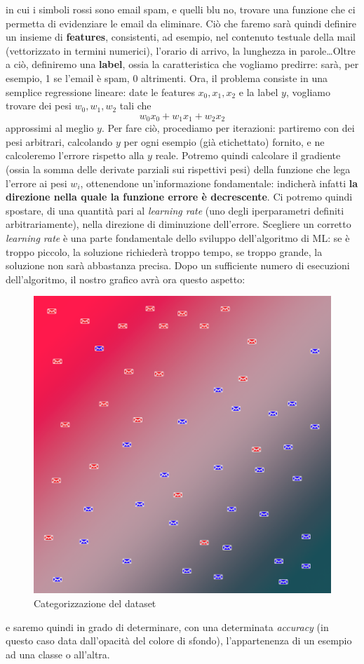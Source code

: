 in cui i simboli rossi sono email spam, e quelli blu no, trovare una funzione che ci permetta di evidenziare le email da eliminare. Ciò che faremo sarà quindi definire un insieme di \textbf{features}, consistenti, ad esempio, nel contenuto testuale della mail (vettorizzato in termini numerici), l'orario di arrivo, la lunghezza in parole\dots Oltre a ciò, definiremo una \textbf{label}, ossia la caratteristica che vogliamo predirre: sarà, per esempio, 1 se l'email è spam, 0 altrimenti. Ora, il problema consiste in una semplice regressione lineare: date le features $x_0, x_1, x_2$ e la label $y$, vogliamo trovare dei pesi $w_0, w_1, w_2$ tali che
\begin{displaymath}
    w_0x_0+w_1x_1+w_2x_2
\end{displaymath}
approssimi al meglio $y$. Per fare ciò, procediamo per iterazioni: partiremo con dei pesi arbitrari, calcolando $y$ per ogni esempio (già etichettato) fornito, e ne calcoleremo l'errore rispetto alla $y$ reale. Potremo quindi calcolare il gradiente (ossia la somma delle derivate parziali sui rispettivi pesi) della funzione che lega l'errore ai pesi $w_i$, ottenendone un'informazione fondamentale: indicherà infatti \textbf{la direzione nella quale la funzione errore è decrescente}. Ci potremo quindi spostare, di una quantità pari al \textit{learning rate} (uno degli iperparametri definiti arbitrariamente), nella direzione di diminuzione dell'errore. Scegliere un corretto \textit{learning rate} è una parte fondamentale dello sviluppo dell'algoritmo di ML: se è troppo piccolo, la soluzione richiederà troppo tempo, se troppo grande, la soluzione non sarà abbastanza precisa. Dopo un sufficiente numero di esecuzioni dell'algoritmo, il nostro grafico avrà ora questo aspetto:
\begin{figure}[H]
    \begin{center}
        \includegraphics[width=0.8\columnwidth]{images/stateofart/categorized-spam.png}
    \end{center}
    \caption{Categorizzazione del dataset}
    \label{fig:categorized-spam}
\end{figure}
e saremo quindi in grado di determinare, con una determinata \textit{accuracy} (in questo caso data dall'opacità del colore di sfondo), l'appartenenza di un esempio ad una classe o all'altra.
